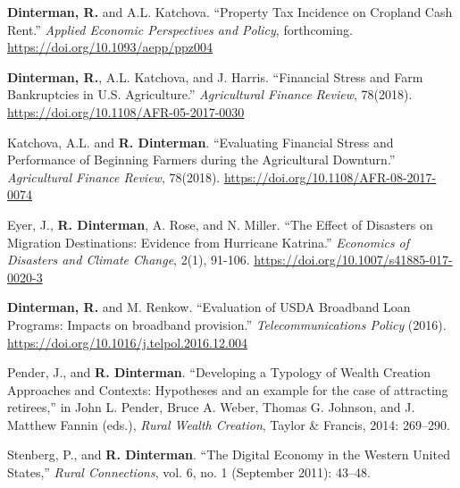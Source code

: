 \documentclass[letterpaper]{article}
\renewenvironment{itemize}{
  \begin{list}{}{
    \setlength{\leftmargin}{1.5em}
  }
}{
  \end{list}
}
\begin{document}
\begin{itemize}
\item \textbf{Dinterman, R.} and A.L. Katchova. ``Property Tax Incidence on Cropland Cash Rent.'' \emph{Applied Economic Perspectives and Policy}, forthcoming. \href{https://doi.org/10.1093/aepp/ppz004}{https://doi.org/10.1093/aepp/ppz004}
\item \textbf{Dinterman, R.}, A.L. Katchova, and J. Harris. ``Financial Stress and Farm Bankruptcies in U.S. Agriculture.'' \emph{Agricultural Finance Review}, 78(2018). \href{https://doi.org/10.1108/AFR-05-2017-0030}{https://doi.org/10.1108/AFR-05-2017-0030}
\item Katchova, A.L. and \textbf{R. Dinterman}. ``Evaluating Financial Stress and Performance of Beginning Farmers during the Agricultural Downturn.'' \emph{Agricultural Finance Review}, 78(2018). \href{https://doi.org/10.1108/AFR-08-2017-0074}{https://doi.org/10.1108/AFR-08-2017-0074}
\item Eyer, J., \textbf{R. Dinterman}, A. Rose, and N. Miller. ``The Effect of Disasters on Migration Destinations: Evidence from Hurricane Katrina.'' \emph{Economics of Disasters and Climate Change}, 2(1), 91-106. \href{https://doi.org/10.1007/s41885-017-0020-3}{https://doi.org/10.1007/s41885-017-0020-3}
\item \textbf{Dinterman, R.} and M. Renkow. ``Evaluation of USDA Broadband Loan Programs: Impacts on broadband provision.'' \emph{Telecommunications Policy} (2016). \href{https://doi.org/10.1016/j.telpol.2016.12.004}{https://doi.org/10.1016/j.telpol.2016.12.004}
\item Pender, J., and \textbf{R. Dinterman}. ``Developing a Typology of Wealth Creation Approaches and Contexts: Hypotheses and an example for the case of attracting retirees,'' in  John L. Pender, Bruce A. Weber, Thomas G. Johnson, and J. Matthew Fannin (eds.), \emph{Rural Wealth Creation}, Taylor \& Francis, 2014: 269--290.
\item Stenberg, P., and \textbf{R. Dinterman}. ``The Digital Economy in the Western United States,'' \emph{Rural Connections}, vol. 6, no. 1 (September 2011): 43--48.
\end{itemize}
\end{document}
